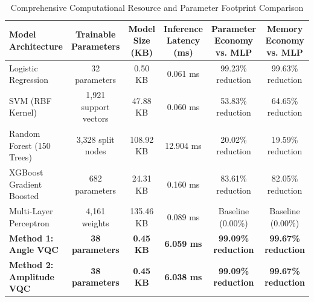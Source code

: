 \documentclass{ieeeaccess}
\begin{document}
\begin{table}[t]
\caption{Comprehensive Computational Resource and Parameter Footprint Comparison}
\label{tab:computational_footprint}
\centering
\begin{tabular*}{\textwidth}{@{\extracolsep{\fill}}lccccc@{}}
\toprule
\textbf{Model Architecture} & \textbf{Trainable Parameters} & \textbf{Model Size (KB)} & \textbf{Inference Latency (ms)} & \textbf{Parameter Economy vs. MLP} & \textbf{Memory Economy vs. MLP} \\
\midrule
Logistic Regression         & 32 parameters                 & 0.50 KB                  & 0.061 ms                        & 99.23\% reduction                  & 99.63\% reduction \\
SVM (RBF Kernel)            & 1,921 support vectors         & 47.88 KB                 & 0.060 ms                        & 53.83\% reduction                  & 64.65\% reduction \\
Random Forest (150 Trees)   & 3,328 split nodes             & 108.92 KB                & 12.904 ms                       & 20.02\% reduction                  & 19.59\% reduction \\
XGBoost Gradient Boosted    & 682 parameters                & 24.31 KB                 & 0.160 ms                        & 83.61\% reduction                  & 82.05\% reduction \\
Multi-Layer Perceptron      & 4,161 weights                 & 135.46 KB                & 0.089 ms                        & Baseline (0.00\%)                  & Baseline (0.00\%) \\
\midrule
\textbf{Method 1: Angle VQC}& \textbf{38 parameters}        & \textbf{0.45 KB}         & \textbf{6.059 ms}               & \textbf{99.09\% reduction}         & \textbf{99.67\% reduction} \\
\textbf{Method 2: Amplitude VQC}& \textbf{38 parameters}    & \textbf{0.45 KB}         & \textbf{6.038 ms}               & \textbf{99.09\% reduction}         & \textbf{99.67\% reduction} \\
\bottomrule
\end{tabular*}
\end{table}
\end{document}
